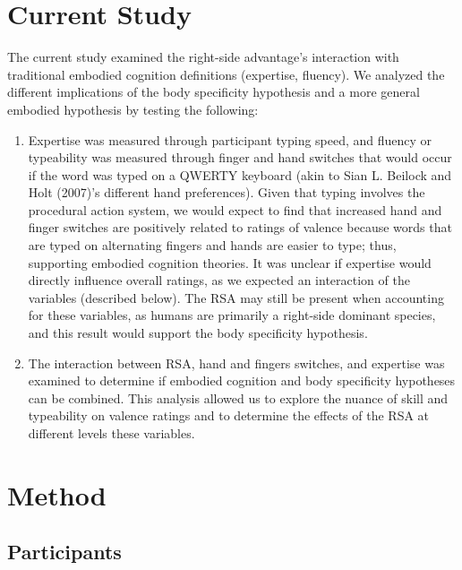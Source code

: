 \documentclass[
  english,
  man]{apa7}
\providecommand{\tightlist}{%
  \setlength{\itemsep}{0pt}\setlength{\parskip}{0pt}}
\begin{document}
\hypertarget{current-study}{%
\section{Current Study}\label{current-study}}

The current study examined the right-side advantage's interaction with traditional embodied cognition definitions (expertise, fluency). We analyzed the different implications of the body specificity hypothesis and a more general embodied hypothesis by testing the following:

\begin{enumerate}
\def\labelenumi{\arabic{enumi})}
\tightlist
\item
  Expertise was measured through participant typing speed, and fluency or typeability was measured through finger and hand switches that would occur if the word was typed on a QWERTY keyboard (akin to Sian L. Beilock and Holt (2007)'s different hand preferences). Given that typing involves the procedural action system, we would expect to find that increased hand and finger switches are positively related to ratings of valence because words that are typed on alternating fingers and hands are easier to type; thus, supporting embodied cognition theories. It was unclear if expertise would directly influence overall ratings, as we expected an interaction of the variables (described below). The RSA may still be present when accounting for these variables, as humans are primarily a right-side dominant species, and this result would support the body specificity hypothesis.
\item
  The interaction between RSA, hand and fingers switches, and expertise was examined to determine if embodied cognition and body specificity hypotheses can be combined. This analysis allowed us to explore the nuance of skill and typeability on valence ratings and to determine the effects of the RSA at different levels these variables.
\end{enumerate}

\hypertarget{method}{%
\section{Method}\label{method}}

\hypertarget{participants}{%
\subsection{Participants}\label{participants}}
\end{document}
